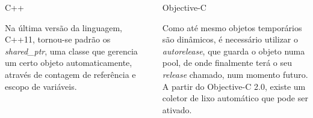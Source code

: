 \documentclass[brazil]{beamer}
\begin{document}
\begin{frame}
  \begin{columns}
    \begin{column}{.5\textwidth}
        \begin{center}
            C++
        \end{center}
        Na última versão da linguagem, C++11, tornou-se padrão os \textit{shared\_ptr},
        uma classe que gerencia um certo objeto automaticamente, através de contagem de referência
        e escopo de variáveis.
    \end{column}
    \begin{column}{.5\textwidth}
        \begin{center}
            Objective-C
        \end{center}
        Como até mesmo objetos temporários são dinâmicos, é necessário utilizar o \textit{autorelease},
        que guarda o objeto numa pool, de onde finalmente terá o seu \textit{release} chamado, num momento futuro. \\
        A partir do Objective-C 2.0, existe um coletor de lixo automático que pode ser ativado.
    \end{column}
  \end{columns}
\end{frame}
\end{document}
